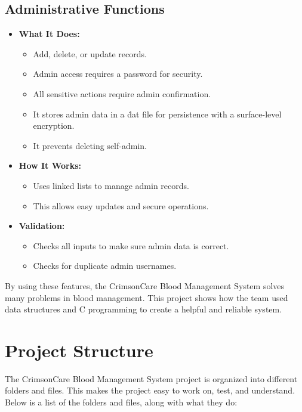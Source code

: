 \documentclass[12pt,a4paper]{report}
\begin{document}
\subsection{Administrative Functions}
\begin{itemize}
    \item \normalsize \textbf{What It Does:}
    \begin{itemize}
        \item Add, delete, or update records.
        \item Admin access requires a password for security.
        \item All sensitive actions require admin confirmation.
        \item It stores admin data in a \.dat file for persistence with a surface-level encryption.
        \item It prevents deleting self-admin.
    \end{itemize}
    \item \normalsize \textbf{How It Works:}
    \begin{itemize}
        \item Uses linked lists to manage admin records.
        \item This allows easy updates and secure operations.
    \end{itemize}
    \item \normalsize \textbf{Validation:}
    \begin{itemize}
        \item Checks all inputs to make sure admin data is correct.
        \item Checks for duplicate admin usernames.
    \end{itemize}
\end{itemize}

By using these features, the CrimsonCare Blood Management System solves many problems in blood management.
This project shows how the team used data structures and C programming to create a helpful and reliable system.

\section{Project Structure}
The CrimsonCare Blood Management System project is organized into different folders and files.
This makes the project easy to work on, test, and understand. Below is a list of the folders and files, along with what they do:
\end{document}

